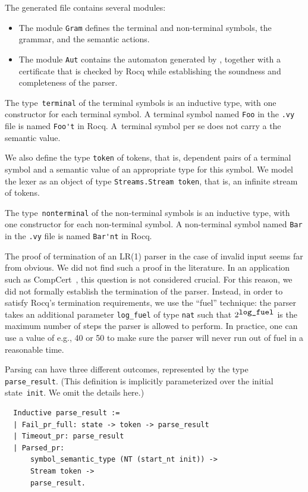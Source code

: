 \documentclass[onecolumn,11pt,nocopyrightspace,preprint]{sigplanconf}
\begin{document}
The generated file contains several modules:

\begin{itemize}
\item The module \verb+Gram+ defines the terminal and
  non-terminal symbols, the grammar, and the semantic actions.
\item The module \verb+Aut+ contains the automaton
  generated by \menhir, together with a certificate that is checked by Rocq
  while establishing the soundness and completeness of the parser.
\end{itemize}

The type~\verb+terminal+ of the terminal symbols is an inductive type, with
one constructor for each terminal symbol. A terminal symbol named \verb+Foo+
in the \verb+.vy+ file is named \verb+Foo't+ in Rocq. A~terminal symbol per se
does not carry a the semantic value.

We also define the type \verb+token+ of tokens, that is, dependent pairs of a
terminal symbol and a semantic value of an appropriate type for this symbol.
We model the lexer as an object of type \verb+Streams.Stream token+, that is,
an infinite stream of tokens.

The type~\verb+nonterminal+ of the non-terminal symbols is an inductive type,
with one constructor for each non-terminal symbol. A non-terminal symbol named
\verb+Bar+ in the \verb+.vy+ file is named \verb+Bar'nt+ in Rocq.

The proof of termination of an LR(1) parser in the case of invalid input seems
far from obvious. We did not find such a proof in the literature. In an
application such as CompCert~\cite{compcert}, this question is not considered
crucial. For this reason, we did not formally establish the termination of the
parser. Instead, in order to satisfy Rocq's termination requirements, we use
the ``fuel'' technique: the parser takes an additional parameter
\verb+log_fuel+ of type \verb+nat+ such that $2^{\verb+log_fuel+}$ is the
maximum number of steps the parser is allowed to perform. In practice, one
can use a value of e.g., 40 or 50 to make sure the parser will never run out
of fuel in a reasonable time.

Parsing can have three different outcomes, represented by the type
\verb+parse_result+.
%
(This definition is implicitly parameterized over the initial
state~\verb+init+. We omit the details here.)
%
\begin{verbatim}
  Inductive parse_result :=
  | Fail_pr_full: state -> token -> parse_result
  | Timeout_pr: parse_result
  | Parsed_pr:
      symbol_semantic_type (NT (start_nt init)) ->
      Stream token ->
      parse_result.
\end{verbatim}
\end{document}
